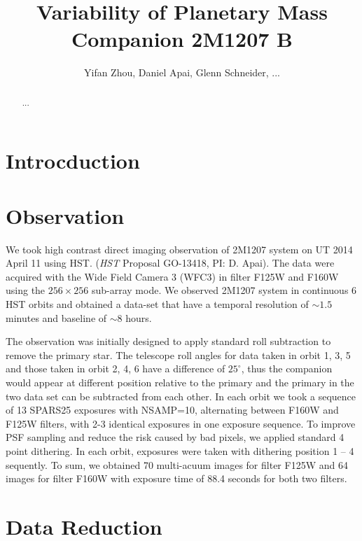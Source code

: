 \documentclass[apj]{emulateapj}
\begin{document}
\title{Variability of Planetary Mass Companion 2M1207 B}
\author{Yifan Zhou, Daniel Apai, Glenn Schneider, ...}

\begin{abstract}
...
\end{abstract}

\maketitle
%
\section{Introcduction}

\section{Observation}
We took high contrast direct imaging observation of 2M1207
system on UT 2014 April 11 using HST.
(\textit{HST} Proposal GO-13418, PI: D. Apai). The data were acquired
with the Wide Field Camera 3 (WFC3) in filter F125W
and F160W using the $256\times256$ sub-array mode. We observed
2M1207 system in continuous 6 HST orbits and obtained a data-set that
have a temporal resolution of $\sim1.5$ minutes and baseline of $\sim
8$ hours.


The observation was initially designed to apply standard roll
subtraction to remove the primary star. The telescope roll angles for
data taken in orbit 1, 3, 5 and those taken in orbit 2, 4, 6 have a
difference of $25^{\circ}$, thus the companion would appear at
different position relative to the primary 
and the primary in the two data set can be subtracted from each other.
In each orbit we took a sequence of 13 SPARS25 exposures with
NSAMP=10, alternating between F160W and F125W filters, with 2-3
identical exposures in one exposure sequence. To improve PSF
sampling and reduce the risk caused by bad pixels, we applied standard 4
point dithering. In each orbit, exposures were taken with dithering
position 1 -- 4 sequently. To sum, we obtained 70 multi-acuum images
for filter F125W and 64 images for filter F160W with exposure time of
88.4 seconds for both two filters.


\section{Data Reduction}
\end{document}
